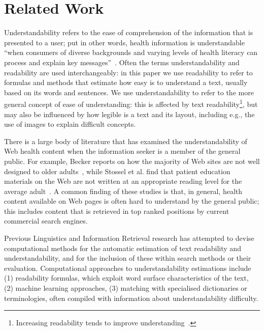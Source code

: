 \section{Related Work}
\label{sec:related}
Understandability refers to the ease of comprehension of the information that is presented to a user; put in other words, health information is understandable ``when consumers of diverse backgrounds and varying levels of health literacy can process and explain key messages''~\cite{shoemaker2014development}. Often the terms understandability and readability are used interchangeably: in this paper we use readability to refer to formulas and methods that estimate how easy is to understand a text, usually based on its words and sentences. We use understandability to refer to the more general concept of ease of understanding: this is affected by text readability\footnote{Increasing readability tends to improve understanding~\cite{ley1996use}.}, but may also be influenced by how legible is a text and its layout, including e.g., the use of images to explain difficult concepts.

There is a large body of literature that has examined the understandability of Web health content when the information seeker is a member of the general public. For example, Becker reports on how the majority of Web sites are not well designed to older adults~\cite{becker04}, while Stossel et al. find that patient education materials on the Web are not written at an appropriate reading level for the average adult~\cite{stossel12}.
A common finding of these studies is that, in general, health content available on Web pages is often hard to understand by the general public; this includes content that is retrieved in top ranked positions by current commercial search engines.

Previous Linguistics and Information Retrieval research has attempted to devise computational methods for the automatic estimation of text readability and understandability, and for the inclusion of these within search methods or their evaluation. Computational approaches to understandability estimations include (1) readability formulas, which exploit word surface characteristics of the text, (2) machine learning approaches, (3) matching with specialised dictionaries or terminologies, often compiled with information about understandability difficulty.

